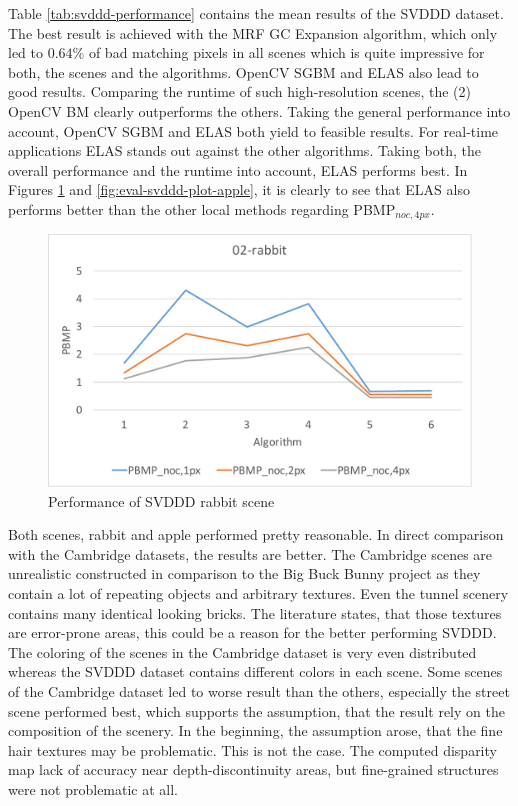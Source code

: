 \noindent Table \ref{tab:svddd-performance} contains the mean results of the SVDDD dataset.
The best result is achieved with the MRF GC Expansion algorithm, which only led to $0.64\%$ of bad matching pixels in all scenes which is quite impressive for both, the scenes and the algorithms.
OpenCV SGBM and ELAS also lead to good results.
Comparing the runtime of such high-resolution scenes, the (2) OpenCV BM clearly outperforms the others.
Taking the general performance into account, OpenCV SGBM and ELAS both yield to feasible results.
For real-time applications ELAS stands out against the other algorithms.
Taking both, the overall performance and the runtime into account, ELAS performs best.
In Figures \ref{fig:eval-svddd-plot-rabbit} and \ref{fig:eval-svddd-plot-apple}, it is clearly to see that ELAS also performs better than the other local methods regarding PBMP$_{noc,4px}$.

\begin{figure}[h!]
\centering
\includegraphics[width=1.0\textwidth]{src/images/evaluation/svddd/02-rabbit-plot.pdf}
\caption[Performance of SVDDD rabbit scene]{Performance of SVDDD rabbit scene}
\label{fig:eval-svddd-plot-rabbit}
\end{figure}

\noindent Both scenes, rabbit and apple performed pretty reasonable.
In direct comparison with the Cambridge datasets, the results are better.
The Cambridge scenes are unrealistic constructed in comparison to the Big Buck Bunny project as they contain a lot of repeating objects and arbitrary textures.
Even the tunnel scenery contains many identical looking bricks.
The literature states, that those textures are error-prone areas, this could be a reason for the better performing SVDDD.
The coloring of the scenes in the Cambridge dataset is very even distributed whereas the SVDDD dataset contains different colors in each scene.
Some scenes of the Cambridge dataset led to worse result than the others, especially the street scene performed best, which supports the assumption, that the result rely on the composition of the scenery.
In the beginning, the assumption arose, that the fine hair textures may be problematic.
This is not the case.
The computed disparity map lack of accuracy near depth-discontinuity areas, but fine-grained structures were not problematic at all.

